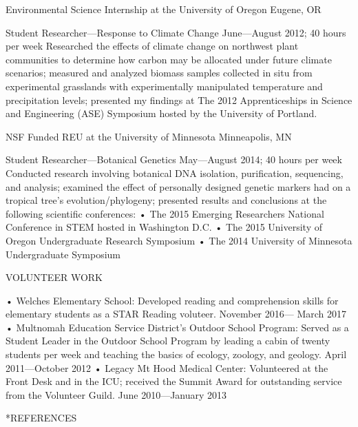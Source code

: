 Environmental Science Internship at the University of Oregon {Eugene,
OR}

Student Researcher---Response to Climate Change June---August 2012; 40
hours per week Researched the effects of climate change on northwest
plant communities to determine how carbon may be allocated under future
climate scenarios; measured and analyzed biomass samples collected in
situ from experimental grasslands with experimentally manipulated
temperature and precipitation levels; presented my findings at The 2012
Apprenticeships in Science and Engineering (ASE) Symposium hosted by the
University of Portland.

NSF Funded REU at the University of Minnesota {Minneapolis, MN}

Student Researcher---Botanical Genetics May---August 2014; 40 hours per
week Conducted research involving botanical DNA isolation, purification,
sequencing, and analysis; examined the effect of personally designed
genetic markers had on a tropical tree's evolution/phylogeny; presented
results and conclusions at the following scientific conferences: • The
2015 Emerging Researchers National Conference in STEM hosted in
Washington D.C. • The 2015 University of Oregon Undergraduate Research
Symposium • The 2014 University of Minnesota Undergraduate Symposium

VOLUNTEER WORK

• Welches Elementary School: Developed reading and comprehension skills
for elementary students as a STAR Reading voluteer. November 2016---
March 2017 • Multnomah Education Service District's Outdoor School
Program: Served as a Student Leader in the Outdoor School Program by
leading a cabin of twenty students per week and teaching the basics of
ecology, zoology, and geology. April 2011---October 2012 • Legacy Mt
Hood Medical Center: Volunteered at the Front Desk and in the ICU;
received the Summit Award for outstanding service from the Volunteer
Guild. June 2010---January 2013

*REFERENCES
